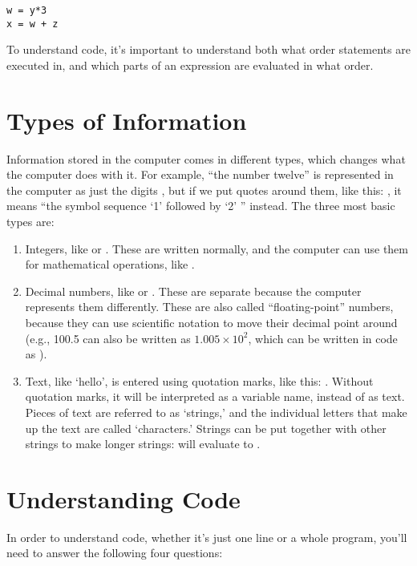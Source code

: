 \documentclass{handout}
\begin{document}
\begin{lstlisting}
w = y*3
x = w + z
\end{lstlisting}

To understand code, it's important to understand both what order statements are executed in, and which parts of an expression are evaluated in what order.


\section{Types of Information}

Information stored in the computer comes in different types, which changes what the computer does with it. For example, ``the number twelve'' is represented in the computer as just the digits , but if we put quotes around them, like this: , it means ``the symbol sequence `1' followed by `2' '' instead. The three most basic types are:

\begin{enumerate}
  \item Integers, like  or . These are written normally, and the computer can use them for mathematical operations, like .

  \item Decimal numbers, like  or . These are separate because the computer represents them differently. These are also called ``floating-point'' numbers, because they can use scientific notation to move their decimal point around (e.g., 100.5 can also be written as $1.005\times10^2$, which can be written in code as ).

  \item Text, like `hello', is entered using quotation marks, like this: . Without quotation marks, it will be interpreted as a variable name, instead of as text. Pieces of text are referred to as `strings,' and the individual letters that make up the text are called `characters.' Strings can be put together with other strings to make longer strings:  will evaluate to .
\end{enumerate}


\section{Understanding Code}

In order to understand code, whether it's just one line or a whole program, you'll need to answer the following four questions:
\end{document}
